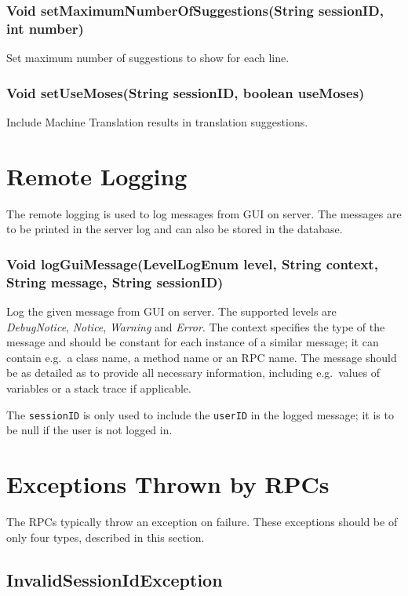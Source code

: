 \subsubsection{Void setMaximumNumberOfSuggestions(String sessionID, int number)}
Set maximum number of suggestions to show for each line.

\subsubsection{Void setUseMoses(String sessionID, boolean useMoses)}
Include Machine Translation results in translation suggestions.

\section{Remote Logging}
\label{sec:rpc:remotelog}

The remote logging is used to log messages from GUI on server. The messages are to be printed in the server log and can also be stored in the database.

\subsubsection{Void logGuiMessage(LevelLogEnum level, String context, String message, String sessionID)}
Log the given message from GUI on server.
The supported levels are \emph{DebugNotice}, \emph{Notice}, \emph{Warning} and \emph{Error}.
The context specifies the type of the message and should be constant for each instance of a similar message; it can contain e.g.\ a class name, a method name or an RPC name. The message should be as detailed as to provide all necessary information, including e.g.\ values of variables or a stack trace if applicable.

The {\tt sessionID} is only used to include the {\tt userID} in the logged message; it is to be null if the user is not logged in.

\section{Exceptions Thrown by RPCs}
\label{sec:rpc:exceptions}

The RPCs typically throw an exception on failure. These exceptions should be of only four types, described in this section.

\subsection{InvalidSessionIdException}

